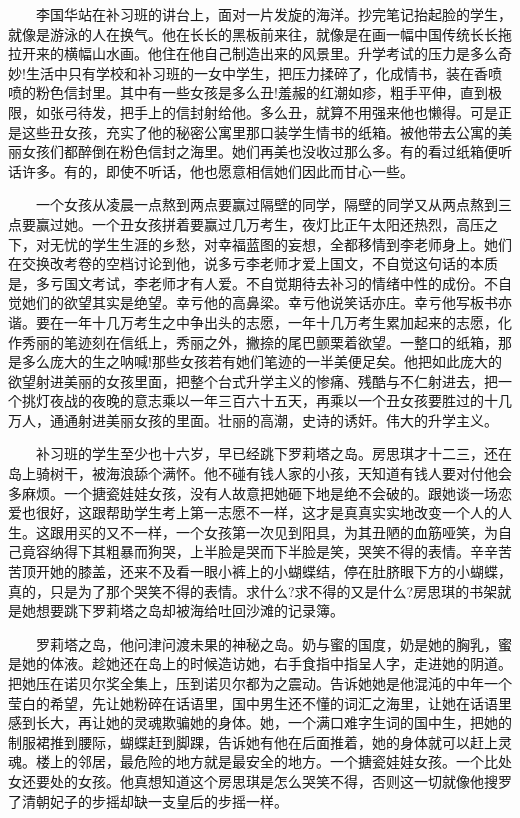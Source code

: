 \documentclass[12pt,UTF8]{ctexbook}
\begin{document}
　　李国华站在补习班的讲台上，面对一片发旋的海洋。抄完笔记抬起脸的学生，就像是游泳的人在换气。他在长长的黑板前来往，就像是在画一幅中国传统长长拖拉开来的横幅山水画。他住在他自己制造出来的风景里。升学考试的压力是多么奇妙!生活中只有学校和补习班的一女中学生，把压力揉碎了，化成情书，装在香喷喷的粉色信封里。其中有一些女孩是多么丑!羞赧的红潮如疹，粗手平伸，直到极限，如张弓待发，把手上的信封射给他。多么丑，就算不用强来他也懒得。可是正是这些丑女孩，充实了他的秘密公寓里那口装学生情书的纸箱。被他带去公寓的美丽女孩们都醉倒在粉色信封之海里。她们再美也没收过那么多。有的看过纸箱便听话许多。有的，即使不听话，他也愿意相信她们因此而甘心一些。

　　一个女孩从凌晨一点熬到两点要赢过隔壁的同学，隔壁的同学又从两点熬到三点要赢过她。一个丑女孩拼着要赢过几万考生，夜灯比正午太阳还热烈，高压之下，对无忧的学生生涯的乡愁，对幸福蓝图的妄想，全都移情到李老师身上。她们在交换改考卷的空档讨论到他，说多亏李老师才爱上国文，不自觉这句话的本质是，多亏国文考试，李老师才有人爱。不自觉期待去补习的情绪中性的成份。不自觉她们的欲望其实是绝望。幸亏他的高鼻梁。幸亏他说笑话亦庄。幸亏他写板书亦谐。要在一年十几万考生之中争出头的志愿，一年十几万考生累加起来的志愿，化作秀丽的笔迹刻在信纸上，秀丽之外，撇捺的尾巴颤栗着欲望。一整口的纸箱，那是多么庞大的生之呐喊!那些女孩若有她们笔迹的一半美便足矣。他把如此庞大的欲望射进美丽的女孩里面，把整个台式升学主义的惨痛、残酷与不仁射进去，把一个挑灯夜战的夜晚的意志乘以一年三百六十五天，再乘以一个丑女孩要胜过的十几万人，通通射进美丽女孩的里面。壮丽的高潮，史诗的诱奸。伟大的升学主义。

　　补习班的学生至少也十六岁，早已经跳下罗莉塔之岛。房思琪才十二三，还在岛上骑树干，被海浪舔个满怀。他不碰有钱人家的小孩，天知道有钱人要对付他会多麻烦。一个搪瓷娃娃女孩，没有人故意把她砸下地是绝不会破的。跟她谈一场恋爱也很好，这跟帮助学生考上第一志愿不一样，这才是真真实实地改变一个人的人生。这跟用买的又不一样，一个女孩第一次见到阳具，为其丑陋的血筋哑笑，为自己竟容纳得下其粗暴而狗哭，上半脸是哭而下半脸是笑，哭笑不得的表情。辛辛苦苦顶开她的膝盖，还来不及看一眼小裤上的小蝴蝶结，停在肚脐眼下方的小蝴蝶，真的，只是为了那个哭笑不得的表情。求什么?求不得的又是什么?房思琪的书架就是她想要跳下罗莉塔之岛却被海给吐回沙滩的记录簿。

　　罗莉塔之岛，他问津问渡未果的神秘之岛。奶与蜜的国度，奶是她的胸乳，蜜是她的体液。趁她还在岛上的时候造访她，右手食指中指呈人字，走进她的阴道。把她压在诺贝尔奖全集上，压到诺贝尔都为之震动。告诉她她是他混沌的中年一个莹白的希望，先让她粉碎在话语里，国中男生还不懂的词汇之海里，让她在话语里感到长大，再让她的灵魂欺骗她的身体。她，一个满口难字生词的国中生，把她的制服裙推到腰际，蝴蝶赶到脚踝，告诉她有他在后面推着，她的身体就可以赶上灵魂。楼上的邻居，最危险的地方就是最安全的地方。一个搪瓷娃娃女孩。一个比处女还要处的女孩。他真想知道这个房思琪是怎么哭笑不得，否则这一切就像他搜罗了清朝妃子的步摇却缺一支皇后的步摇一样。
\end{document}
